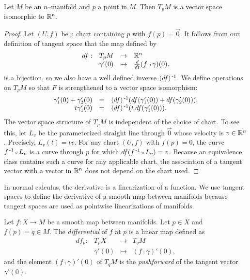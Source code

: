 \begin{prop}
	\label{prop:tangentspacevectorspace}
	Let $M$ be an $n$--manifold and $p$ a point in $M$.
	Then $T_p M$ is a vector space isomorphic to $\mathbb{R}^n$.
\end{prop}

\begin{proof}
	Let $(U,f)$ be a chart containing $p$ with $f(p)=\vec{0}$.
	It follows from our definition of tangent space that the map defined by
	\[
		\begin{array}{crcl}
			df : & T_p M & \to & \RRN \\
			& \gamma'(0) & \mapsto & \Ddt(f\comp \gamma)(0) .
		\end{array}
	\]
	is a bijection, so we also have a well defined inverse $(df)^{\,\text{-}1}$.
	We define operations on $T_p M$ so that $F$ is strengthened to a vector space isomorphism:
	\[
		\begin{array}{rcl}
			\gamma_1'(0)+\gamma_2'(0) & = & (df)^{\,\text{-}1}(df(\gamma_1'(0))+df(\gamma_2'(0))), \\
			t\gamma_1'(0) & = & (df)^{\,\text{-}1}(t\:df(\gamma_1'(0))).
		\end{array}
	\]
	The vector space structure of $T_p M$ is independent of the choice of chart.
	To see this, let $L_v$ be the parameterized straight line through $\vec{0}$ whose velocity is $v\in\mathbb{R}^n$.
	Precisely, $L_v(t)=tv.$
	For any chart $(U,f)$ with $f(p)=0$, the curve $f\inv\comp L_v$ is a curve through $p$ for which $df(f\inv\comp L_v)=v$.
	Because an equivalence class contains such a curve for any applicable chart, the association of a tangent vector with a vector in $\mathbb{R}^n$ does not depend on the chart used.
\end{proof}

In normal calculus, the derivative is a linearization of a function.
We use tangent spaces to define the derivative of a smooth map between manifolds because tangent spaces are used as pointwise linearizations of manifolds.

\begin{defn}[Differential]
	Let $f:X\to M$ be a smooth map between manifolds.
	Let $p\in X$ and $f(p)=q\in M$.
	The \emph{differential} of $f$ at $p$ is a linear map defined as
	\[
		\begin{array}{crcl}
			df_p: & T_p X & \to & T_q M\\
					  & \gamma'(0) & \mapsto & (f\comp\gamma)'(0),
		\end{array}
	\]
	and the element $(f\comp\gamma)'(0)$ of $T_q M$ is the \emph{pushforward} of the tangent vector $\gamma'(0)$.
\end{defn}

